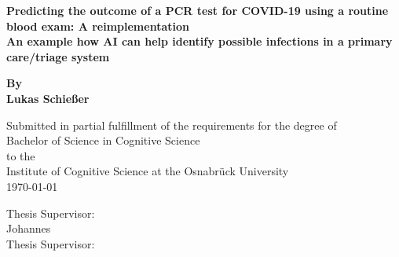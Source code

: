 \begin{titlepage}
	\begin{center}
		\vspace*{1cm}
		\Huge
		\textbf{Predicting the outcome of a PCR test for COVID-19 using a 
routine blood exam: A reimplementation \\} 
		\vspace{0.5cm}
		\Large
		\textbf{An example how AI can help identify possible infections in a 
primary care/triage system}
		
		\vspace{1cm}
		
		\textbf{By \\ Lukas Schießer}
		
		\vspace{1cm}
		\small
		Submitted in partial fulfillment of the requirements for the degree of \\
		Bachelor of Science in Cognitive Science \\ to the \\
		Institute of Cognitive Science at the Osnabrück University\\
		\today
		
		\vfill
		\vspace{1cm}
		Thesis Supervisor:\\ Johannes  \\
		Thesis Supervisor:\\   
		
		
		
	\end{center}
\end{titlepage}
